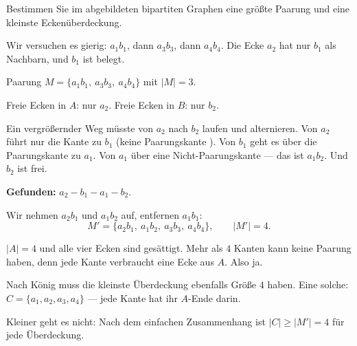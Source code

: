 \begin{aufgabe}
Bestimmen Sie im abgebildeten bipartiten Graphen eine größte Paarung und eine kleinste Eckenüberdeckung.

\begin{center}
\end{center}

\loesung
{}
Wir versuchen es gierig: $a_1b_1$, dann $a_3b_3$, dann $a_4b_4$. Die Ecke $a_2$ hat nur $b_1$ als Nachbarn, und $b_1$ ist belegt.

Paarung $M = \{a_1b_1,\ a_3b_3,\ a_4b_4\}$ mit $|M| = 3$.

Freie Ecken in $A$: nur $a_2$. Freie Ecken in $B$: nur $b_2$.

Ein vergrößernder Weg müsste von $a_2$ nach $b_2$ laufen und alternieren. Von $a_2$ führt nur die Kante zu $b_1$ (keine Paarungskante \checkmark). Von $b_1$ geht es über die Paarungskante zu $a_1$. Von $a_1$ über eine Nicht-Paarungskante --- das ist $a_1b_2$. Und $b_2$ ist frei.

\textbf{Gefunden:} $a_2 - b_1 - a_1 - b_2$.

Wir nehmen $a_2b_1$ und $a_1b_2$ auf, entfernen $a_1b_1$:
\[ M' = \{a_2b_1,\ a_1b_2,\ a_3b_3,\ a_4b_4\}, \qquad |M'| = 4 . \]

$|A| = 4$ und alle vier Ecken sind gesättigt. Mehr als $4$ Kanten kann keine Paarung haben, denn jede Kante verbraucht eine Ecke aus $A$. Also ja.

Nach König muss die kleinste Überdeckung ebenfalls Größe $4$ haben. Eine solche: $C = \{a_1, a_2, a_3, a_4\}$ --- jede Kante hat ihr $A$-Ende darin.

Kleiner geht es nicht: Nach dem einfachen Zusammenhang ist $|C| \ge |M'| = 4$ für jede Überdeckung. \checkmark

\begin{center}
\begin{minipage}{0.86\textwidth}
\end{minipage}
\end{center}
\end{aufgabe}

